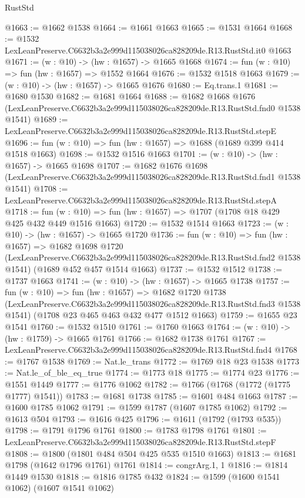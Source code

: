 \begin{lexlean}{RustStd}
\begin{coremodule}
@1663 := @1662 @1538
@1664 := @1661 @1663
@1665 := @1531 @1664
@1668 := @1532 LexLeanPreserve.C6632b3a2e999d115038026ca828209de.R13.RustStd.it0 @1663
@1671 := (w : @10) -> (hw : @1657) -> @1665 @1668
@1674 := fun (w : @10) => fun (hw : @1657) => @1552 @1664
@1676 := @1532 @1518 @1663
@1679 := (w : @10) -> (hw : @1657) -> @1665 @1676
@1680 := Eq.trans.{1}
@1681 := @1680 @1530
@1682 := @1681 @1664
@1688 := @1682
    @1668
    @1676
    (LexLeanPreserve.C6632b3a2e999d115038026ca828209de.R13.RustStd.fnd0 @1538 @1541)
@1689 := LexLeanPreserve.C6632b3a2e999d115038026ca828209de.R13.RustStd.stepE
@1696 := fun (w : @10) => fun (hw : @1657) => @1688 (@1689 @399 @414 @1518 @1663)
@1698 := @1532 @1516 @1663
@1701 := (w : @10) -> (hw : @1657) -> @1665 @1698
@1707 := @1682
    @1676
    @1698
    (LexLeanPreserve.C6632b3a2e999d115038026ca828209de.R13.RustStd.fnd1 @1538 @1541)
@1708 := LexLeanPreserve.C6632b3a2e999d115038026ca828209de.R13.RustStd.stepA
@1718 := fun (w : @10) => fun (hw : @1657) => @1707 (@1708 @18 @429 @425 @432 @449 @1516 @1663)
@1720 := @1532 @1514 @1663
@1723 := (w : @10) -> (hw : @1657) -> @1665 @1720
@1736 := fun (w : @10) =>
  fun (hw : @1657) =>
  @1682
    @1698
    @1720
    (LexLeanPreserve.C6632b3a2e999d115038026ca828209de.R13.RustStd.fnd2 @1538 @1541)
    (@1689 @452 @457 @1514 @1663)
@1737 := @1532 @1512
@1738 := @1737 @1663
@1741 := (w : @10) -> (hw : @1657) -> @1665 @1738
@1757 := fun (w : @10) =>
  fun (hw : @1657) =>
  @1682
    @1720
    @1738
    (LexLeanPreserve.C6632b3a2e999d115038026ca828209de.R13.RustStd.fnd3 @1538 @1541)
    (@1708 @23 @465 @463 @432 @477 @1512 @1663)
@1759 := @1655 @23 @1541
@1760 := @1532 @1510
@1761 := @1760 @1663
@1764 := (w : @10) -> (hw : @1759) -> @1665 @1761
@1766 := @1682 @1738 @1761
@1767 := LexLeanPreserve.C6632b3a2e999d115038026ca828209de.R13.RustStd.fnd4
@1768 := @1767 @1538
@1769 := Nat.le_trans
@1772 := @1769 @18 @23 @1538
@1773 := Nat.le_of_ble_eq_true
@1774 := @1773 @18
@1775 := @1774 @23
@1776 := @1551 @1449
@1777 := @1776 @1062
@1782 := @1766 (@1768 (@1772 (@1775 @1777) @1541))
@1783 := @1681 @1738
@1785 := @1601 @484 @1663
@1787 := @1600 @1785 @1062
@1791 := @1599 @1787 (@1607 @1785 @1062)
@1792 := @1613 @504
@1793 := @1616 @425
@1796 := @1611 (@1792 (@1793 @535))
@1798 := @1791 @1796 @1761
@1800 := @1783 @1798 @1761
@1801 := LexLeanPreserve.C6632b3a2e999d115038026ca828209de.R13.RustStd.stepF
@1808 := @1800 (@1801 @484 @504 @425 @535 @1510 @1663)
@1813 := @1681 @1798 (@1642 @1796 @1761) @1761
@1814 := congrArg.{1, 1}
@1816 := @1814 @1449 @1530
@1818 := @1816 @1785 @432
@1824 := @1599 (@1600 @1541 @1062) (@1607 @1541 @1062)

\end{coremodule}
\end{lexlean}
